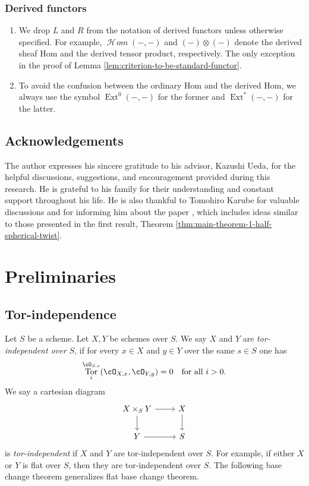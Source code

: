\documentclass[12pt]{amsart}
\numberwithin{equation}{section}
\theoremstyle{plain}
\theoremstyle{definition}
\DeclareMathOperator{\Tor}{\mathrm{Tor}}
\DeclareMathOperator{\CHom}{\mathcal{H}\!\mathit{om}}
\DeclareMathOperator{\Ext}{\mathrm{Ext}}
\begin{document}
\subsubsection*{Derived functors}
\begin{enumerate}
    \item We drop $L$ and $R$ from the notation of derived functors unless otherwise specified. For example, $\CHom(-, -)$ and $(-)\otimes (-)$ denote the derived sheaf Hom and the derived tensor product, respectively. The only exception in the proof of Lemma \ref{lem:criterion-to-be-standard-functor}.
    \item To avoid the confusion between the ordinary Hom and the derived Hom, we always use the symbol $\Ext^0(-, -)$ for the former and $\Ext^*(-, -)$ for the latter.
\end{enumerate}


\subsection*{Acknowledgements}
The author expresses his sincere gratitude to his advisor, Kazushi Ueda, for the helpful discussions, suggestions, and encouragement provided during this research.
He is grateful to his family for their understanding and constant support throughout his life.
He is also thankful to Tomohiro Karube for valuable discussions and for informing him about the paper \cite{karube2023stability}, which includes ideas similar to those presented in the first result, Theorem \ref{thm:main-theorem-1-half-spherical-twist}.




\section{Preliminaries}\label{section:preliminaries}
\subsection{Tor-independence}
Let $S$ be a scheme.
Let $X, Y$ be schemes over $S$.
We say $X$ and $Y$ are \emph{tor-independent over $S$}, if for every $x \in X$ and $y \in Y$ over the same $s \in S$ one has
\begin{equation}
    \Tor_i^{\cO_{S, s}}(\cO_{X, x}, \cO_{Y, y}) = 0 \quad \text{for all } i > 0.
\end{equation}
We say a cartesian diagram
\[
    \begin{tikzcd}
        X \times_S Y \ar[r] \ar[d] & X \ar[d]\\
        Y \ar[r] & S
    \end{tikzcd}
\]
is \emph{tor-independent} if $X$ and $Y$ are tor-independent over $S$.
For example, if either $X$ or $Y$ is flat over $S$, then they are tor-independent over $S$.
The following base change theorem generalizes flat base change theorem.
\end{document}
